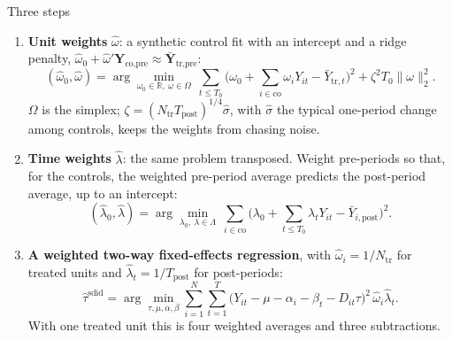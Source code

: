 \documentclass[
  11pt,
  ignorenonframetext,
  aspectratio=169,
]{beamer}
\providecommand{\tightlist}{%
  \setlength{\itemsep}{0pt}\setlength{\parskip}{0pt}}
\begin{document}
\begin{frame}{Three steps}
\protect{}\label{three-steps}
\begin{enumerate}
\tightlist
\item
  \textbf{Unit weights} \(\hat\omega\): a synthetic control fit with an
  intercept and a ridge penalty,
  \(\hat\omega_0 + \hat\omega' \mathbf Y_{\text{co},\text{pre}} \approx \bar{\mathbf Y}_{\text{tr},\text{pre}}\):
  \[
  (\hat\omega_0, \hat\omega) = \arg\min_{\omega_0 \in \mathbb R,\ \omega \in \Omega}\ \textstyle\sum_{t \leq T_0} \big( \omega_0 + \sum_{i \in \text{co}} \omega_i Y_{it} - \bar Y_{\text{tr},t} \big)^2 + \zeta^2 T_0 \|\omega\|_2^2 .
  \] \(\Omega\) is the simplex;
  \(\zeta = (N_{\text{tr}} T_{\text{post}})^{1/4} \hat\sigma\), with
  \(\hat\sigma\) the typical one-period change among controls, keeps the
  weights from chasing noise.
\item
  \textbf{Time weights} \(\hat\lambda\): the same problem transposed.
  Weight pre-periods so that, for the controls, the weighted pre-period
  average predicts the post-period average, up to an intercept: \[
  (\hat\lambda_0, \hat\lambda) = \arg\min_{\lambda_0,\ \lambda \in \Lambda}\ \textstyle\sum_{i \in \text{co}} \big( \lambda_0 + \sum_{t \leq T_0} \lambda_t Y_{it} - \bar Y_{i,\text{post}} \big)^2 .
  \]
\item
  \textbf{A weighted two-way fixed-effects regression}, with
  \(\hat\omega_i = 1/N_{\text{tr}}\) for treated units and
  \(\hat\lambda_t = 1/T_{\text{post}}\) for post-periods: \[
  \hat\tau^{\text{sdid}} = \arg\min_{\tau, \mu, \alpha, \beta} \textstyle\sum_{i=1}^{N} \sum_{t=1}^{T} \big( Y_{it} - \mu - \alpha_i - \beta_t - D_{it}\tau \big)^2\, \hat\omega_i \hat\lambda_t .
  \] With one treated unit this is four weighted averages and three
  subtractions.
\end{enumerate}
\end{frame}
\end{document}

